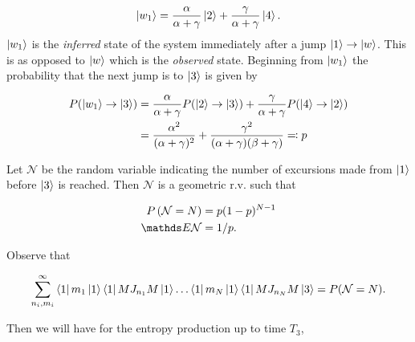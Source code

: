 \begin{equation}\label{w1_comb_state}
    \ket{w_1} = \frac{\alpha}{\alpha + \gamma} \ket{2} +  \frac{\gamma}{\alpha + \gamma} \ket{4}.
\end{equation}
$\ket{w_1}$ is the \emph{inferred} state of the system immediately after a jump $\ket{1} \rightarrow \ket{w}$. This is as opposed to $\ket{w}$ which is the \emph{observed} state. Beginning from $\ket{w_1}$ the probability that the next jump is to $\ket{3}$ is given by

\begin{align}
\begin{split}
P(\ket{w_1}\rightarrow \ket{3}) &= \frac{\alpha}{\alpha + \gamma} P(\ket{2} \rightarrow \ket{3}) + \frac{\gamma}{\alpha + \gamma} P(\ket{4} \rightarrow \ket{2}) \\
&= \frac{\alpha^2}{(\alpha + \gamma)^2} +  \frac{\gamma^2}{(\alpha + \gamma)(\beta +\gamma)} \eqqcolon p
\end{split}
\end{align}


Let $\mathcal{N}$ be the random variable indicating the number of excursions made from $\ket{1}$ before $\ket{3}$ is reached. Then $\mathcal{N}$ is a geometric r.v. such that

\begin{align}
\begin{split}
P\left(\mathcal{N} = N\right) &= p(1-p)^{N-1} \\
\bE \mathcal{N} &= 1/p.
\end{split}
\end{align}

Observe that

\begin{align}
\sum_{n_i,m_i}^\infty \bra{1}m_1\ket{1}\bra{1}MJ_{n_1}M\ket{1}\ldots\bra{1}m_N\ket{1}\bra{1}MJ_{n_N}M\ket{3} = P(\mathcal{N} = N).
\end{align}

Then we will have for the entropy production up to time $T_3$,

